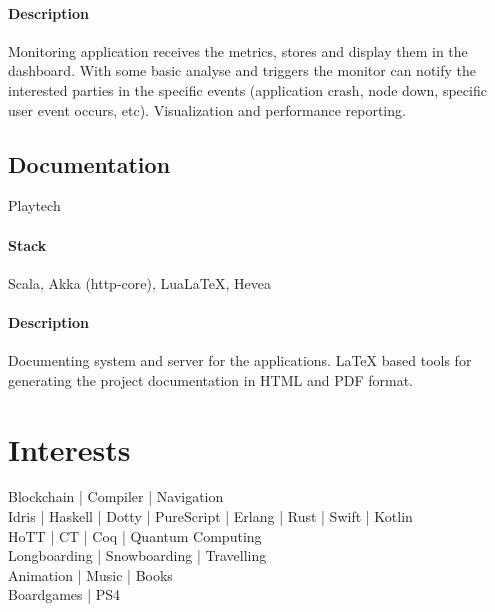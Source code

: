 \paragraph{Description}
Monitoring application receives the metrics, stores and display them in the dashboard. With some basic analyse and triggers the monitor can notify the interested parties in the specific events (application crash, node down, specific user event occurs, etc). Visualization and performance reporting.

\subsection{Documentation}
Playtech
\paragraph{Stack} Scala, Akka (http-core), LuaLaTeX, Hevea
\paragraph{Description}
Documenting system and server for the applications. LaTeX based tools for generating the project documentation in HTML and PDF format.

\section{Interests}
Blockchain | Compiler | Navigation\\
Idris | Haskell | Dotty | PureScript | Erlang | Rust | Swift | Kotlin\\
HoTT | CT | Coq | Quantum Computing\\
Longboarding | Snowboarding | Travelling\\
Animation | Music | Books\\
Boardgames | PS4
